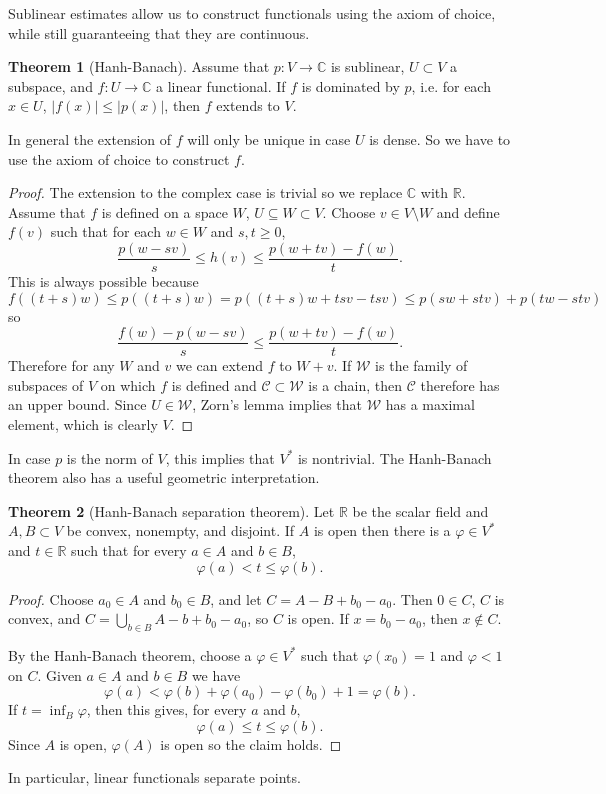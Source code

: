 \documentclass[12pt]{report}
\newcommand{\RR}{\mathbb{R}}
\newcommand{\CC}{\mathbb{C}}
\theoremstyle{definition}
\newtheorem{theorem}{Theorem}[chapter]
\begin{document}
    Sublinear estimates allow us to construct functionals using the axiom of choice, while still guaranteeing that they are continuous.
\begin{theorem}[Hanh-Banach]
    Assume that $p: V \to \CC$ is sublinear, $U \subset V$ a subspace, and $f: U \to \CC$ a linear functional. If $f$ is dominated by $p$, i.e. for each $x \in U$, $|f(x)| \leq |p(x)|$, then $f$ extends to $V$.
\end{theorem}
    In general the extension of $f$ will only be unique in case $U$ is dense. So we have to use the axiom of choice to construct $f$.
\begin{proof}
    The extension to the complex case is trivial so we replace $\CC$ with $\RR$. Assume that $f$ is defined on a space $W$, $U \subseteq W \subset V$. Choose $v \in V \setminus W$ and define $f(v)$ such that for each $w \in W$ and $s,t \geq 0$,
$$\frac{p(w-sv)}{s} \leq h(v) \leq \frac{p(w+tv) - f(w)}{t}.$$
    This is always possible because
    $$f((t+s)w) \leq p((t+s)w) = p((t+s)w + tsv - tsv) \leq p(sw + stv) + p(tw - stv)$$
    so
    $$\frac{f(w) - p(w - sv)}{s} \leq \frac{p(w+tv) - f(w)}{t}.$$
    Therefore for any $W$ and $v$ we can extend $f$ to $W + v$. If $\mathcal W$ is the family of subspaces of $V$ on which $f$ is defined and $\mathcal C \subset \mathcal W$ is a chain, then $\mathcal C$ therefore has an upper bound. Since $U \in \mathcal W$, Zorn's lemma implies that $\mathcal W$ has a maximal element, which is clearly $V$.
\end{proof}
    In case $p$ is the norm of $V$, this implies that $V^*$ is nontrivial. The Hanh-Banach theorem also has a useful geometric interpretation.
\begin{theorem}[Hanh-Banach separation theorem]
    Let $\RR$ be the scalar field and $A, B \subset V$ be convex, nonempty, and disjoint. If $A$ is open then there is a $\varphi \in V^*$ and $t \in \RR$ such that for every $a \in A$ and $b \in B$,
    $$\varphi(a) < t \leq \varphi(b).$$
\end{theorem}
\begin{proof}
    Choose $a_0 \in A$ and $b_0 \in B$, and let $C = A - B + b_0 - a_0$. Then $0 \in C$, $C$ is convex, and $C = \bigcup_{b \in B} A - b + b_0 - a_0$, so $C$ is open. If $x = b_0 - a_0$, then $x \notin C$.

    By the Hanh-Banach theorem, choose a $\varphi \in V^*$ such that $\varphi(x_0) = 1$ and $\varphi < 1$ on $C$. Given $a \in A$ and $b \in B$ we have
    $$\varphi(a) < \varphi(b) + \varphi(a_0) - \varphi(b_0) + 1 = \varphi(b).$$
    If $t = \inf_B \varphi$, then this gives, for every $a$ and $b,$
    $$\varphi(a) \leq t \leq \varphi(b).$$
    Since $A$ is open, $\varphi(A)$ is open so the claim holds.
\end{proof}
    In particular, linear functionals separate points.
\end{document}
